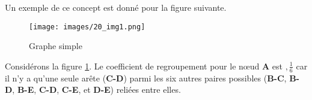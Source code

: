 Un exemple de ce concept est donné pour la figure suivante.

\begin{figure}[h!]
\centering
\texttt{[image: images/20\_img1.png]}
\caption{Graphe simple}
\label{img:coef-regr-exp}
\end{figure}

Considérons la figure \ref{img:coef-regr-exp}. Le coefficient de regroupement pour le nœud \textbf{A} est $,\frac{1}{6}$ car il n'y a qu'une seule arête (\textbf{C-D}) parmi les six autres paires possibles (\textbf{B-C}, \textbf{B-D}, \textbf{B-E}, \textbf{C-D}, \textbf{C-E}, et \textbf{D-E}) reliées entre elles.
